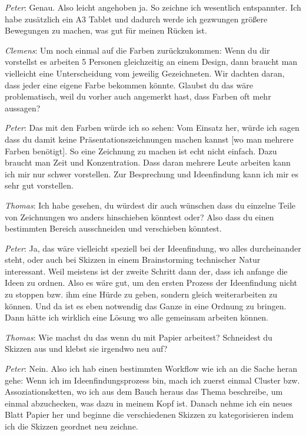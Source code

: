 \medskip \emph{Peter}: Genau. Also leicht angehoben ja. So zeichne ich wesentlich entspannter. Ich habe zusätzlich ein A3 Tablet und dadurch werde ich gezwungen größere Bewegungen zu machen, was gut für meinen Rücken ist.

\medskip \emph{Clemens}: Um noch einmal auf die Farben zurückzukommen: Wenn du dir vorstellst es arbeiten 5 Personen gleichzeitig an einem Design, dann braucht man vielleicht eine Unterscheidung vom jeweilig Gezeichneten. Wir dachten daran, dass jeder eine eigene Farbe bekommen könnte. Glaubst du das wäre problematisch, weil du vorher auch angemerkt hast, dass Farben oft mehr aussagen?

\medskip \emph{Peter}: Das mit den Farben würde ich so sehen: Vom Einsatz her, würde ich sagen dass du damit keine Präsentationszeichnungen machen kannst [wo man mehrere Farben benötigt]. So eine Zeichnung zu machen ist echt nicht einfach. Dazu braucht man Zeit und Konzentration. Dass daran mehrere Leute arbeiten kann ich mir nur schwer vorstellen. Zur Besprechung und Ideenfindung kann ich mir es sehr gut vorstellen.

\medskip \emph{Thomas}: Ich habe gesehen, du würdest dir auch wünschen dass du einzelne Teile von Zeichnungen wo anders hinschieben könntest oder? Also dass du einen bestimmten Bereich ausschneiden und verschieben könntest. 

\medskip \emph{Peter}: Ja, das wäre vielleicht speziell bei der Ideenfindung, wo alles durcheinander steht, oder auch bei Skizzen in einem Brainstorming technischer Natur interessant. Weil meistens ist der zweite Schritt dann der, dass ich anfange die Ideen zu ordnen. Also es wäre gut, um den ersten Prozess der Ideenfindung nicht zu stoppen bzw. ihm eine Hürde zu geben, sondern gleich weiterarbeiten zu können. Und da ist es eben notwendig das Ganze in eine Ordnung zu bringen. Dann hätte ich wirklich eine Lösung wo alle gemeinsam arbeiten können.

\medskip \emph{Thomas}: Wie machst du das wenn du mit Papier arbeitest? Schneidest du Skizzen aus und klebst sie irgendwo neu auf?

\medskip \emph{Peter}: Nein. Also ich hab einen bestimmten Workflow wie ich an die Sache heran gehe: Wenn ich im Ideenfindungsprozess bin, mach ich zuerst einmal Cluster bzw. Assoziationsketten, wo ich aus dem Bauch heraus das Thema beschreibe, um einmal abzuchecken, was dazu in meinem Kopf ist. Danach nehme ich ein neues Blatt Papier her und beginne die verschiedenen Skizzen zu kategorisieren indem ich die Skizzen geordnet neu zeichne.

